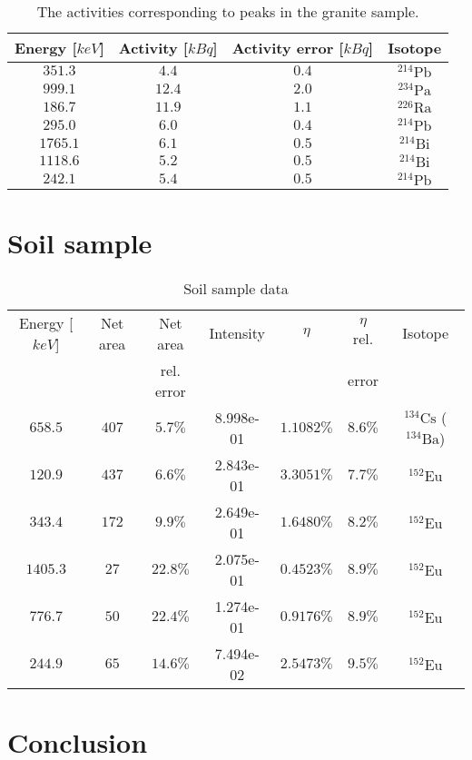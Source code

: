\documentclass[pdftex,12pt,a4paper]{article}
\begin{document}
		\begin{table}[H]
		\centering
		\begin{tabular}{|c|c|c|c|}
			\hline
			Energy [$keV$] & Activity [$kBq$]& Activity error [$kBq$]& Isotope \\
			\hline
                        $351.3$ & $4.4$ & $0.4$ & $^{214}\text{Pb}$ \\
            $999.1$ & $12.4$ & $2.0$ & $^{234}\text{Pa}$ \\
            $186.7$ & $11.9$ & $1.1$ & $^{226}\text{Ra}$ \\
            $295.0$ & $6.0$ & $0.4$ & $^{214}\text{Pb}$ \\
            $1765.1$ & $6.1$ & $0.5$ & $^{214}\text{Bi}$ \\
            $1118.6$ & $5.2$ & $0.5$ & $^{214}\text{Bi}$ \\
            $242.1$ & $5.4$ & $0.5$ & $^{214}\text{Pb}$ \\
			\hline
		\end{tabular}
		\caption{The activities corresponding to peaks in the granite sample.}
		 \label{granitepeaks}
		\end{table}
	\section{Soil sample}
		\begin{table}[H]
		\centering
		\begin{tabular}{|c|c|c|c|c|c|c|}
			\hline
			Energy [$keV$] & Net area & Net area   & Intensity & $\eta$ & $\eta$ rel. & Isotope \\
			               &          & rel. error &           &        & error       &         \\
			\hline
            $658.5$ & $407$ & $5.7\%$ & 8.998e-01 & $1.1082\%$ & $8.6\%$ & $^{134}\text{Cs}$ ($^{134}\text{Ba}$) \\
            $120.9$ & $437$ & $6.6\%$ & 2.843e-01 & $3.3051\%$ & $7.7\%$ & $^{152}\text{Eu}$ \\
            $343.4$ & $172$ & $9.9\%$ & 2.649e-01 & $1.6480\%$ & $8.2\%$ & $^{152}\text{Eu}$ \\
            $1405.3$ & $27$ & $22.8\%$ & 2.075e-01 & $0.4523\%$ & $8.9\%$ & $^{152}\text{Eu}$ \\
            $776.7$ & $50$ & $22.4\%$ & 1.274e-01 & $0.9176\%$ & $8.9\%$ & $^{152}\text{Eu}$ \\
            $244.9$ & $65$ & $14.6\%$ & 7.494e-02 & $2.5473\%$ & $9.5\%$ & $^{152}\text{Eu}$ \\
			\hline
		\end{tabular}
		\caption{Soil sample data}
		\end{table}
	\section{Conclusion}
	
    
\end{document}
